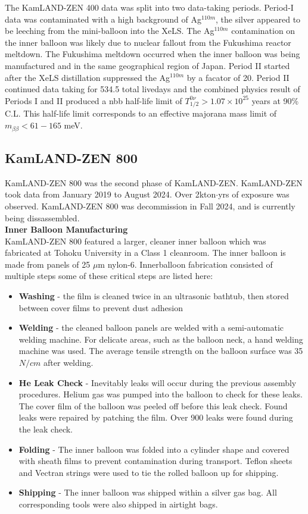 The KamLAND-ZEN 400 data was split into two data-taking periods. Period-I data was contaminated with a high background of Ag$^{110m}$, the silver appeared to be leeching from the mini-balloon into the XeLS. The Ag$^{110m}$ contamination on the inner balloon was likely due to nuclear fallout from the Fukushima reactor meltdown. The Fukushima meltdown occurred when the inner balloon was being manufactured and in the same geographical region of Japan. Period II started after the XeLS distillation suppressed the Ag$^{110m}$ by a facator of 20. Period II continued data taking for 534.5 total livedays and the combined physics result of Periods I and II produced a \0nbb half-life limit of $T_{1/2}^{0\nu}>1.07\times 10^{25}$ years at 90\% C.L. This half-life limit corresponds to an effective majorana mass limit of $m_{\beta\beta} < 61-165$ meV. 
\subsection{KamLAND-ZEN 800}
KamLAND-ZEN 800 was the second phase of KamLAND-ZEN. KamLAND-ZEN took data from January 2019 to August 2024. Over 2kton$\cdot$yrs of exposure was observed. KamLAND-ZEN 800 was decommission in Fall 2024, and is currently being dissassembled. \\
\textbf{Inner Balloon Manufacturing}\\
KamLAND-ZEN 800 featured a larger, cleaner inner balloon which was fabricated at Tohoku University in a Class 1 cleanroom. The inner balloon is made from panels of 25 $\mu$m nylon-6. Innerballoon fabrication consisted of multiple steps some of these critical steps are listed here:
\begin{itemize}
	\item \textbf{Washing} - the film is cleaned twice in an ultrasonic bathtub, then stored between cover films to prevent dust adhesion
	\item \textbf{Welding} - the cleaned balloon panels are welded with a semi-automatic welding machine. For delicate areas, such as the balloon neck, a hand welding machine was used. The average tensile strength on the balloon surface was 35 $N/cm$ after welding.
	\item \textbf{He Leak Check} - Inevitably leaks will occur during the previous assembly procedures. Helium gas was pumped into the balloon to check for these leaks. The cover film of the balloon was peeled off before this leak check. Found leaks were repaired by patching the film. Over 900 leaks were found during the leak check.
	\item \textbf{Folding} - The inner balloon was folded into a cylinder shape and covered with sheath films to prevent contamination during transport. Teflon sheets and Vectran strings were used to tie the rolled balloon up for shipping.
	\item \textbf{Shipping} - The inner balloon was shipped within a silver gas bag. All corresponding tools were also shipped in airtight bags.
\end{itemize}

